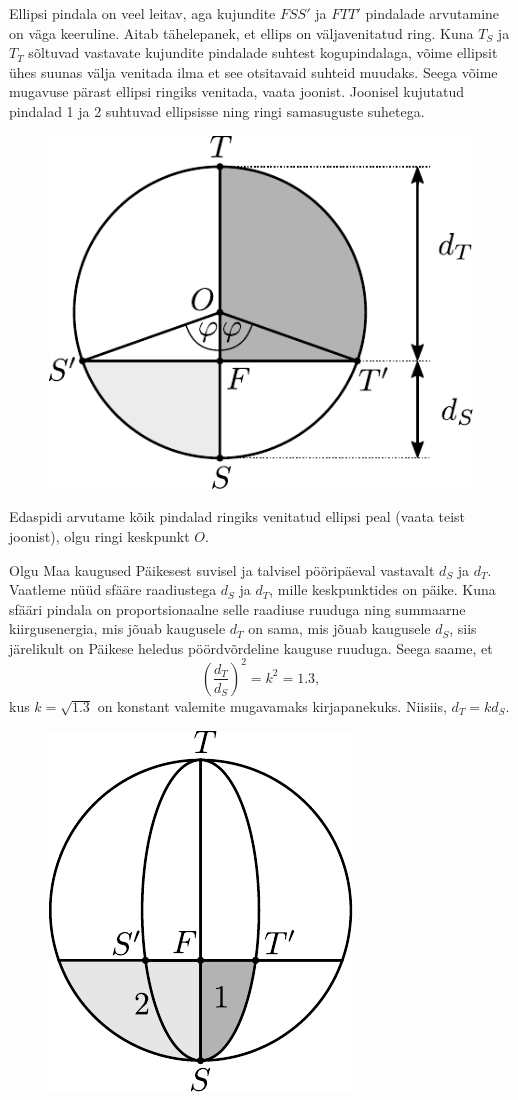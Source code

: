 \documentclass[10pt]{article}
\begin{document}
Ellipsi pindala on veel leitav, aga kujundite $FSS'$ ja $FTT'$ pindalade arvutamine on väga keeruline. Aitab tähelepanek, et ellips on väljavenitatud ring. Kuna $T_S$ ja $T_T$ sõltuvad vastavate kujundite pindalade suhtest kogupindalaga, võime ellipsit ühes suunas välja venitada ilma et see otsitavaid suhteid muudaks. Seega võime mugavuse pärast ellipsi ringiks venitada, vaata joonist. Joonisel kujutatud pindalad 1 ja 2 suhtuvad ellipsisse ning ringi samasuguste suhetega.

\begin{figure}[H]
	\centering
	\includegraphics[width=0.4\linewidth]{2020-lahg-09-yl1.pdf}
\end{figure}

Edaspidi arvutame kõik pindalad ringiks venitatud ellipsi peal (vaata teist joonist), olgu ringi keskpunkt $O$.


Olgu Maa kaugused Päikesest suvisel ja talvisel pööripäeval vastavalt $d_S$ ja $d_T$. Vaatleme nüüd sfääre raadiustega $d_S$ ja $d_T$, mille keskpunktides on päike. Kuna sfääri pindala on proportsionaalne selle raadiuse ruuduga ning summaarne kiirgusenergia, mis jõuab kaugusele $d_T$ on sama, mis jõuab kaugusele $d_S$, siis järelikult on Päikese heledus pöördvõrdeline kauguse ruuduga. Seega saame, et
\[
\left(\frac{d_T}{d_S}\right)^2 = k^2 = \num{1.3},
\]
kus $k = \sqrt{\num{1.3}}$ on konstant valemite mugavamaks kirjapanekuks. Niisiis, $d_T = kd_S$.

\begin{figure}[H]
	\centering
	\includegraphics[width=0.6\linewidth]{2020-lahg-09-yl2.pdf}
\end{figure}
\end{document}
